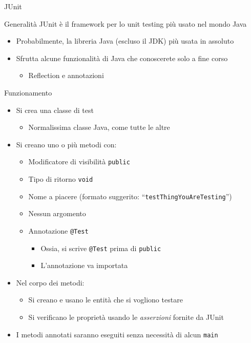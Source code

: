 \documentclass[presentation]{beamer}
\begin{document}
\begin{frame}[allowframebreaks]{JUnit}
	\begin{block}{Generalità}
		JUnit è il framework per lo unit testing più usato nel mondo Java
		\begin{itemize}
			\item Probabilmente, la libreria Java (escluso il JDK) più usata in assoluto
			\item Sfrutta alcune funzionalità di Java che conoscerete solo a fine corso
			\begin{itemize}
				\item Reflection e annotazioni
			\end{itemize}
		\end{itemize}
	\end{block}
	\begin{block}{Funzionamento}
		\begin{itemize}
			\item Si crea una classe di test
			\begin{itemize}
				\item Normalissima classe Java, come tutte le altre
			\end{itemize}
			\item Si creano uno o più metodi con:
			\begin{itemize}
				\item Modificatore di visibilità \texttt{public}
				\item Tipo di ritorno \texttt{void}
				\item Nome a piacere (formato suggerito: ``\texttt{testThingYouAreTesting}'')
				\item Nessun argomento
				\item Annotazione \texttt{@Test}
				\begin{itemize}
					\item Ossia, si scrive \texttt{@Test} prima di \texttt{public}
					\item L'annotazione va importata
				\end{itemize}
			\end{itemize}
			\item Nel corpo dei metodi:
			\begin{itemize}
				\item Si creano e usano le entità che si vogliono testare
				\item Si verificano le proprietà usando le \textit{asserzioni} fornite da JUnit
			\end{itemize}
			\item I metodi annotati saranno eseguiti senza necessità di alcun \texttt{main}

\end{itemize}
\end{block}
\end{frame}
\end{document}
